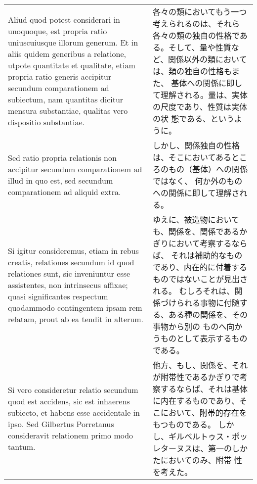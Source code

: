 \documentclass[10pt]{jsarticle} %
\begin{document}
\begin{longtable}{p{21em}p{21em}}
\\


Aliud
quod potest considerari in unoquoque, est propria ratio uniuscuiusque
illorum generum. Et in aliis quidem generibus a relatione, utpote
quantitate et qualitate, etiam propria ratio generis accipitur secundum
comparationem ad subiectum, nam quantitas dicitur mensura substantiae,
qualitas vero dispositio substantiae. 


&

各々の類においてもう一つ考えられるのは、それら各々の類の独自の性格であ
 る。そして、量や性質など、関係以外の類においては、類の独自の性格もまた、
 基体への関係に即して理解される。量は、実体の尺度であり、性質は実体の状
 態である、というように。


\\



Sed ratio propria relationis non
accipitur secundum comparationem ad illud in quo est, sed secundum
comparationem ad aliquid extra. 



&


しかし、関係独自の性格は、そこにおいてあるところのもの（基体）への関係ではなく、
 何か外のものへの関係に即して理解される。

\\


Si igitur consideremus, etiam in rebus
creatis, relationes secundum id quod relationes sunt, sic inveniuntur
esse assistentes, non intrinsecus affixae; quasi significantes respectum
quodammodo contingentem ipsam rem relatam, prout ab ea tendit in
alterum. 



&

ゆえに、被造物においても、関係を、関係であるかぎりにおいて考察するならば、
それは補助的なものであり、内在的に付着するものではないことが見出される。
むしろそれは、関係づけられる事物に付随する、ある種の関係を、その事物から別の
 ものへ向かうものとして表示するものである。


\\



Si vero consideretur relatio secundum quod est accidens, sic
est inhaerens subiecto, et habens esse accidentale in ipso. Sed
Gilbertus Porretanus consideravit relationem primo modo tantum. 


&

他方、もし、関係を、それが附帯性であるかぎりで考察するならば、それは基体
 に内在するものであり、そこにおいて、附帯的存在をもつものである。
しかし、ギルベルトゥス・ポッレターヌスは、第一のしかたにおいてのみ、附帯
 性を考えた。



\end{longtable}
\end{document}
